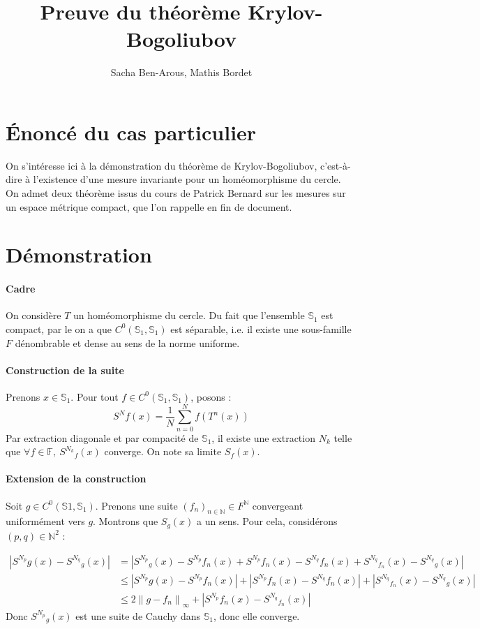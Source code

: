 \documentclass{article}
\title{Preuve du théorème Krylov-Bogoliubov}
\author{Sacha Ben-Arous, Mathis Bordet}
\date{}
\begin{document}
\maketitle

\section{Énoncé du cas particulier}

On s'intéresse ici à la démonstration du théorème de Krylov-Bogoliubov, c'est-à-dire à l'existence d'une mesure invariante pour un homéomorphisme du cercle. On admet deux théorème issus du cours de Patrick Bernard sur les mesures sur un espace métrique compact, que l'on rappelle en fin de document.

\section{Démonstration}

\paragraph{Cadre}
On considère $T$ un homéomorphisme du cercle. Du fait que l'ensemble $\mathbb{S}_1$ est compact, par le  on a que $C^0(\mathbb{S}_1,\mathbb{S}_1)$ est séparable, i.e. il existe une sous-famille $F$ dénombrable et dense au sens de la norme uniforme.

\paragraph{Construction de la suite}
Prenons $x \in \mathbb{S}_1$.
Pour tout $f \in C^0(\mathbb{S}_1,\mathbb{S}_1)$, posons :
\[
{S^N}f (x)= \frac{1}{N} \sum_{n=0}^N f(T^n(x))
\]
Par extraction diagonale et par compacité de $\mathbb{S}_1$, il existe une extraction $N_k$ telle que $\forall f \in \mathbb{F}, \: {S^{N_k}}_f (x)$ converge. On note sa limite $S_f (x)$.

\paragraph{Extension de la construction}
Soit $g \in C^0(\mathbb{S}1,\mathbb{S}_1)$. Prenons une suite $(f_n)_{n \in \mathbb{N}} \in F^\mathbb{N}$ convergeant uniformément vers $g$.
Montrons que $S_g (x)$ a un sens. Pour cela, considérons $(p, q) \in \mathbb{N}^2$ :

\[
\begin{aligned}
|{S^{N_p}}g (x) - {S^{N_q}}_g (x)| &= \left| {S^{N_p}}_g (x) - {S^{N_p}}{f_n} (x) + {S^{N_p}}{f_n} (x) - {S^{N_q}}{f_n} (x) + {S^{N_q}}_{f_n} (x) - {S^{N_q}}_g (x) \right| \\
&\leq \left| {S^{N_p}}g (x) - {S^{N_p}}{f_n} (x) \right| + \left| {S^{N_p}}{f_n} (x) - {S^{N_q}}{f_n} (x) \right| + \left| {S^{N_q}}_{f_n} (x) - {S^{N_q}}_g (x) \right| \\
&\leq 2 \left\| g - f_n \right\|_\infty + \left| {S^{N_p}}{f_n} (x) - {S^{N_q}}_{f_n} (x) \right|
\end{aligned}
\]
Donc ${S^{N_p}}_g (x)$ est une suite de Cauchy dans $\mathbb{S}_1$, donc elle converge.
\end{document}
